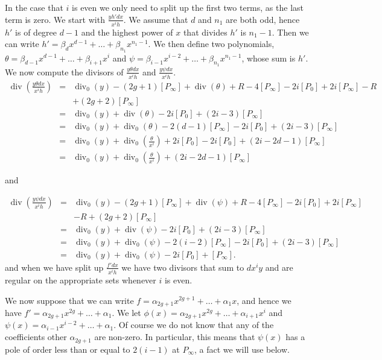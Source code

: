 \documentclass[draft, 11pt]{article} %
\theoremstyle{plain}
\theoremstyle{remark}
\DeclareMathOperator{\di}{div}
\begin{document}
In the case that $i$ is even we only need to split up the first two terms, as the last term is zero.
We start with $\frac{yh'dx}{x^ih}$.
We assume that $d$ and $n_1$ are both odd, hence $h'$ is of degree $d-1$ and the highest power of $x$ that divides $h'$ is $n_1-1$.
Then we can write $h' = \beta_d x^{d-1} + \ldots + \beta_{n_1} x^{n_1-1}$.
We then define two polynomials, $\theta = \beta_{d-1} x^{d-1} + \ldots + \beta_{i+1}x^i$ and $\psi = \beta_{i-1}x^{i-2} + \ldots + \beta_{n_1}x^{n_1-1}$, whose sum is $h'$.
We now compute the divisors of $\frac{y\theta dx}{x^ih}$ and $\frac{y\psi dx}{x^ih}$. 
\begin{eqnarray*}
\di\left(\frac{y\theta dx}{x^ih}\right) & = & \di_0(y) - (2g+1)[P_\infty] + \di(\theta) + R - 4[P_\infty] -2i[P_0] + 2i[P_\infty] - R \\
& &  + (2g+2)[P_\infty] \\
& = & \di_0(y) + \di(\theta) -2i[P_0] + (2i -3)[P_\infty] \\
& = & \di_0(y) + \di_0(\theta) - 2(d-1)[P_\infty] - 2i[P_0] + (2i-3)[P_\infty] \\
& = & \di_0(y) + \di_0\left(\frac{\theta}{x^i}\right) + 2i[P_0] -2i[P_0] + (2i-2d-1)[P_\infty]\\
& = & \di_0(y) + \di_0\left(\frac{\theta}{x^i} \right) + (2i-2d-1)[P_\infty]
\end{eqnarray*}

and

\begin{eqnarray*}
\di\left( \frac{y\psi dx}{x^ih} \right) & = & \di_0(y) - (2g+1)[P_\infty] + \di(\psi) + R - 4[P_\infty] - 2i[P_0] + 2i[P_\infty] \\
& & - R + (2g+2)[P_\infty] \\
& = & \di_0(y) + \di(\psi) -2i[P_0] + (2i-3)[P_\infty] \\
& = & \di_0(y) + \di_0(\psi) - 2(i-2)[P_\infty] - 2i[P_0] + (2i-3)[P_\infty] \\
& = & \di_0(y) + \di_0(\psi) -2i[P_0] + [P_\infty].
\end{eqnarray*}
 and when we have split up $\frac{f'dx}{x^ih}$ we have two divisors that sum to $dx^iy$ and are regular on the appropriate sets whenever $i$ is even.



We now suppose that we can write $f = \alpha_{2g+1} x^{2g+1} + \ldots + \alpha_1x$, and hence we have $f' = \alpha_{2g+1}x^{2g} + \ldots + \alpha_1$.
We let $\phi (x) = \alpha_{2g+1}x^{2g} + \ldots + \alpha_{i+1}x^i$ and $\psi (x) = \alpha_{i-1}x^{i-2} + \ldots + \alpha_1$.
Of course we do not know that any of the coefficients other $\alpha_{2g+1}$ are non-zero.
In particular, this means that $\psi(x)$ has a pole of order less than or equal to $2(i-1)$ at $P_\infty$, a fact we will use below.
\end{document}
